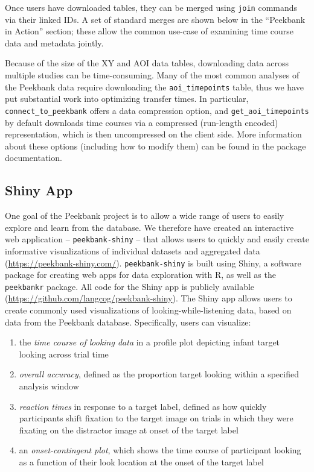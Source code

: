 \documentclass[
  english,
  man,floatsintext]{apa6}
\providecommand{\tightlist}{%
  \setlength{\itemsep}{0pt}\setlength{\parskip}{0pt}}
\begin{document}
Once users have downloaded tables, they can be merged using \texttt{join} commands via their linked IDs. A set of standard merges are shown below in the ``Peekbank in Action'' section; these allow the common use-case of examining time course data and metadata jointly.

Because of the size of the XY and AOI data tables, downloading data across multiple studies can be time-consuming. Many of the most common analyses of the Peekbank data require downloading the \texttt{aoi\_timepoints} table, thus we have put substantial work into optimizing transfer times. In particular, \texttt{connect\_to\_peekbank} offers a data compression option, and \texttt{get\_aoi\_timepoints} by default downloads time courses via a compressed (run-length encoded) representation, which is then uncompressed on the client side. More information about these options (including how to modify them) can be found in the package documentation.

\hypertarget{shiny-app}{%
\subsection{Shiny App}\label{shiny-app}}

One goal of the Peekbank project is to allow a wide range of users to easily explore and learn from the database.
We therefore have created an interactive web application -- \texttt{peekbank-shiny} -- that allows users to quickly and easily create informative visualizations of individual datasets and aggregated data (\url{https://peekbank-shiny.com/}).
\texttt{peekbank-shiny} is built using Shiny, a software package for creating web apps for data exploration with R, as well as the \texttt{peekbankr} package.
All code for the Shiny app is publicly available (\url{https://github.com/langcog/peekbank-shiny}).
The Shiny app allows users to create commonly used visualizations of looking-while-listening data, based on data from the Peekbank database.
Specifically, users can visualize:

\begin{enumerate}
\def\labelenumi{\arabic{enumi}.}
\tightlist
\item
  the \emph{time course of looking data} in a profile plot depicting infant target looking across trial time
\item
  \emph{overall accuracy}, defined as the proportion target looking within a specified analysis window
\item
  \emph{reaction times} in response to a target label, defined as how quickly participants shift fixation to the target image on trials in which they were fixating on the distractor image at onset of the target label
\item
  an \emph{onset-contingent plot}, which shows the time course of participant looking as a function of their look location at the onset of the target label
\end{enumerate}
\end{document}
